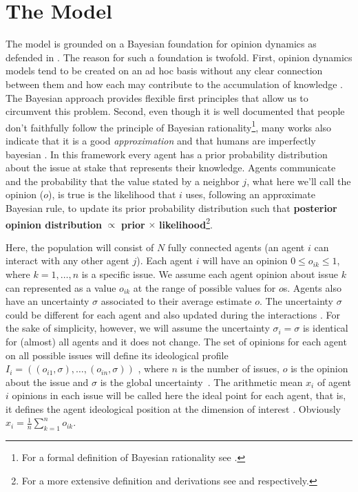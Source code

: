 \documentclass{article}
\begin{document}
\section{The Model}
The model is grounded on a Bayesian foundation for opinion dynamics as defended
in \cite{martins12b}. The reason for such a foundation is twofold. First,
opinion dynamics models tend to be created on an ad hoc basis without any clear
connection between them and how each may contribute to the accumulation of
knowledge \cite{flache2017}. The Bayesian approach provides flexible first
principles that allow us to circumvent this problem. Second, even though it is
well documented that people don't faithfully follow the principle of Bayesian
rationality\footnote{For a formal definition of Bayesian rationality see
  \cite[p.104]{gintis2016individuality}.}, many works also indicate that it is a
good \textit{approximation} and that humans are imperfectly bayesian
\cite{tenenbaumetal07,kempetal10a, teglasetal11a, martins05b,
  gintis2016individuality, baker2017rational}. In this framework every agent has
a prior probability distribution about the issue at stake that represents their
knowledge. Agents communicate and the probability that the value stated by a
neighbor $j$, what here we'll call the opinion (\(o\)), is true is the
likelihood that $i$ uses, following an approximate Bayesian rule, to update its
prior probability distribution such that \textbf{posterior opinion distribution}
$\propto$ \textbf{prior} $\times$ \textbf{likelihood}\footnote{For a more
  extensive definition and derivations see \cite{martins12b} and
  \cite{martins2009bayesian} respectively.}.

Here, the population will consist of \(N\) fully connected agents (an agent $i$
can interact with any other agent $j$). Each agent $i$ will have an opinion
$0\leq o_{ik} \leq 1$, where $k=1, \ldots, n$ is a specific issue. We assume
each agent opinion about issue $k$ can represented as a value $o_{ik}$ at the
range of possible values for $o$s. Agents also have an uncertainty $\sigma$
associated to their average estimate $o$. The uncertainty $\sigma$ could be
different for each agent and also updated during the interactions
\cite{martins08c}. For the sake of simplicity, however, we will assume the
uncertainty $\sigma_i =\sigma$ is identical for (almost) all agents and it does
not change. The set of opinions for each agent on all possible issues will
define its ideological profile \(I_i = ( (o_{i 1}, \sigma), \ldots, (o_{i n},
\sigma) ) \) , where \(n\) is the number of issues, \(o\) is the opinion about
the issue and \(\sigma\) is the global uncertainty~\cite{martins2009bayesian}.
The arithmetic mean $x_i$ of agent $i$ opinions in each issue will be called
here the ideal point for each agent, that is, it defines the agent ideological
position at the dimension of interest \cite{armstrong2014analyzing}. Obviously
\( x_i = \frac{1}{n} \sum_{k=1}^{n} o_{ik} \).
\end{document}
